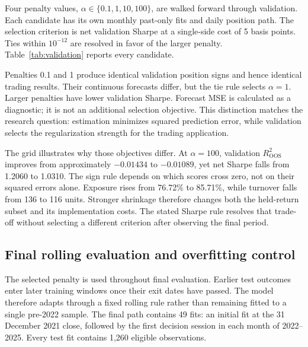 Four penalty values, $\alpha\in\{0.1,1,10,100\}$, are walked forward through validation. Each candidate has its own monthly past-only fits and daily position path. The selection criterion is net validation Sharpe at a single-side cost of 5 basis points. Ties within $10^{-12}$ are resolved in favor of the larger penalty. Table~\ref{tab:validation} reports every candidate.

\begin{table}[!htbp]
\centering\small
\caption{Forward validation, 2019--2021: the complete four-candidate search.}
\label{tab:validation}

\end{table}

Penalties 0.1 and 1 produce identical validation position signs and hence identical trading results. Their continuous forecasts differ, but the tie rule selects $\alpha=1$. Larger penalties have lower validation Sharpe. Forecast MSE is calculated as a diagnostic; it is not an additional selection objective. This distinction matches the research question: estimation minimizes squared prediction error, while validation selects the regularization strength for the trading application.

The grid illustrates why those objectives differ. At $\alpha=100$, validation $R^2_{\mathrm{OOS}}$ improves from approximately $-0.01434$ to $-0.01089$, yet net Sharpe falls from 1.2060 to 1.0310. The sign rule depends on which scores cross zero, not on their squared errors alone. Exposure rises from 76.72\% to 85.71\%, while turnover falls from 136 to 116 units. Stronger shrinkage therefore changes both the held-return subset and its implementation costs. The stated Sharpe rule resolves that trade-off without selecting a different criterion after observing the final period.

\subsection{Final rolling evaluation and overfitting control}
The selected penalty is used throughout final evaluation. Earlier test outcomes enter later training windows once their exit dates have passed. The model therefore adapts through a fixed rolling rule rather than remaining fitted to a single pre-2022 sample. The final path contains 49 fits: an initial fit at the 31 December 2021 close, followed by the first decision session in each month of 2022--2025. Every test fit contains 1,260 eligible observations.


